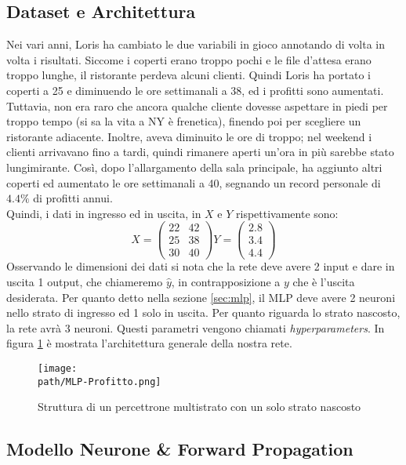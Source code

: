 \subsection{Dataset e Architettura}
Nei vari anni, Loris ha cambiato le due variabili in gioco annotando di volta in volta i risultati. Siccome i coperti erano troppo pochi e le file d'attesa erano troppo lunghe, il ristorante perdeva alcuni clienti. Quindi Loris ha portato i coperti a 25 e diminuendo le ore settimanali a 38, ed i profitti sono aumentati. Tuttavia, non era raro che ancora qualche cliente dovesse aspettare in piedi per troppo tempo (si sa la vita a NY è frenetica), finendo poi per scegliere un ristorante adiacente. Inoltre, aveva diminuito le ore di troppo; nel weekend i clienti arrivavano fino a tardi, quindi rimanere aperti un'ora in più sarebbe stato lungimirante. Così, dopo l'allargamento della sala principale, ha aggiunto altri coperti ed aumentato le ore settimanali a 40, segnando un record personale di $4.4\%$ di profitti annui. \\

Quindi, i dati in ingresso ed in uscita, in $X$ e $Y$ rispettivamente sono:
\[ 
X = \begin{pmatrix}
22 & 42\\ 
25 & 38 \\ 
30 & 40
\end{pmatrix} 
%
Y = \begin{pmatrix}
2.8\\ 
3.4 \\ 
4.4
\end{pmatrix} 
\]
Osservando le dimensioni dei dati si nota che la rete deve avere 2 input e dare in uscita 1 output, che chiameremo $\hat{y}$, in contrapposizione a $y$ che è l'uscita desiderata. Per quanto detto nella sezione \ref{sec:mlp}, il MLP deve avere 2 neuroni nello strato di ingresso ed 1 solo in uscita. Per quanto riguarda lo strato nascosto, la rete avrà 3 neuroni. Questi parametri vengono chiamati \emph{hyperparameters}. In figura \ref{fig:mlp} è mostrata l'architettura generale della nostra rete. 

\begin{figure}[h!]
 \centering
 \texttt{[image: \\path/MLP-Profitto.png]}
 \caption{Struttura di un percettrone multistrato con un solo strato nascosto}
 \label{fig:mlp}
\end{figure}

\subsection{Modello Neurone \& Forward Propagation}
